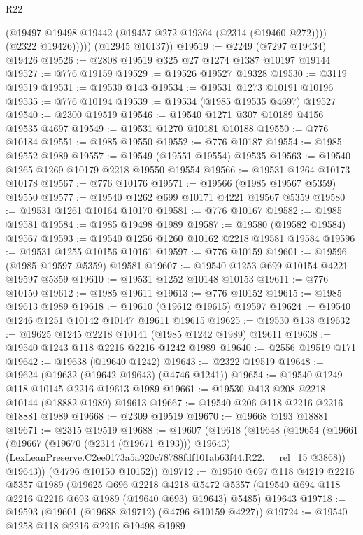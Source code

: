 \begin{lexlean}{R22}
\begin{coremodule}
              (@19497 @19498 @19442 (@19457 @272 @19364 (@2314 (@19460 @272))))
              (@2322 @19426)))))
      (@12945 @10137))
@19519 := @2249 (@7297 @19434) @19426
@19526 := @2808 @19519 @325 @27 @1274 @1387 @10197 @19144
@19527 := @776 @19159
@19529 := @19526 @19527 @19328
@19530 := @3119 @19519
@19531 := @19530 @143
@19534 := @19531 @1273 @10191 @10196
@19535 := @776 @10194
@19539 := @19534 (@1985 @19535 @4697) @19527
@19540 := @2300 @19519
@19546 := @19540 @1271 @307 @10189 @4156 @19535 @4697
@19549 := @19531 @1270 @10181 @10188
@19550 := @776 @10184
@19551 := @1985 @19550
@19552 := @776 @10187
@19554 := @1985 @19552 @1989
@19557 := @19549 (@19551 @19554) @19535
@19563 := @19540 @1265 @1269 @10179 @2218 @19550 @19554
@19566 := @19531 @1264 @10173 @10178
@19567 := @776 @10176
@19571 := @19566 (@1985 @19567 @5359) @19550
@19577 := @19540 @1262 @699 @10171 @4221 @19567 @5359
@19580 := @19531 @1261 @10164 @10170
@19581 := @776 @10167
@19582 := @1985 @19581
@19584 := @1985 @19498 @1989
@19587 := @19580 (@19582 @19584) @19567
@19593 := @19540 @1256 @1260 @10162 @2218 @19581 @19584
@19596 := @19531 @1255 @10156 @10161
@19597 := @776 @10159
@19601 := @19596 (@1985 @19597 @5359) @19581
@19607 := @19540 @1253 @699 @10154 @4221 @19597 @5359
@19610 := @19531 @1252 @10148 @10153
@19611 := @776 @10150
@19612 := @1985 @19611
@19613 := @776 @10152
@19615 := @1985 @19613 @1989
@19618 := @19610 (@19612 @19615) @19597
@19624 := @19540 @1246 @1251 @10142 @10147 @19611 @19615
@19625 := @19530 @138
@19632 := @19625 @1245 @2218 @10141 (@1985 @1242 @1989) @19611
@19638 := @19540 @1243 @118 @2216 @2216 @1242 @1989
@19640 := @2556 @19519 @171
@19642 := @19638 (@19640 @1242)
@19643 := @2322 @19519
@19648 := @19624 (@19632 (@19642 @19643) (@4746 @1241))
@19654 := @19540 @1249 @118 @10145 @2216 @19613 @1989
@19661 := @19530 @413 @208 @2218 @10144 (@18882 @1989) @19613
@19667 := @19540 @206 @118 @2216 @2216 @18881 @1989
@19668 := @2309 @19519
@19670 := @19668 @193 @18881
@19671 := @2315 @19519
@19688 := @19607
    (@19618
      (@19648
        (@19654
          (@19661
            (@19667 (@19670 (@2314 (@19671 @193))) @19643)
            (LexLeanPreserve.C2ee0173a5a920c78788fdf101ab63f44.R22.__rel_15 @3868))
          @19643))
      (@4796 @10150 @10152))
@19712 := @19540
    @697
    @118
    @4219
    @2216
    @5357
    @1989
    (@19625
      @696
      @2218
      @4218
      @5472
      @5357
      (@19540 @694 @118 @2216 @2216 @693 @1989 (@19640 @693) @19643)
      @5485)
    @19643
@19718 := @19593 (@19601 (@19688 @19712) (@4796 @10159 @4227))
@19724 := @19540 @1258 @118 @2216 @2216 @19498 @1989

\end{coremodule}
\end{lexlean}
